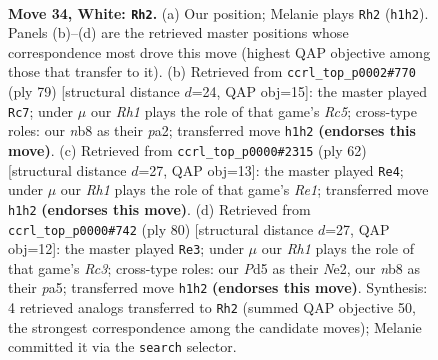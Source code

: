 \documentclass[11pt]{article}
\begin{document}
\clearpage

\begin{figure}[p]\centering
\begin{subfigure}{0.46\textwidth}\centering
\resizebox{\linewidth}{!}{%
\newchessgame
\chessboard[
  setfen={1n4r1/5k2/1p1p4/1P1P4/p1p5/7P/1P1K2P1/7R w - - 2 34},
  showmover=false,
  pgfstyle=straightmove, color=movearrow, markmove={h1-h2}
]}
\caption{}
\end{subfigure}\hfill
\begin{subfigure}{0.46\textwidth}\centering
\resizebox{\linewidth}{!}{%
\newchessgame
\chessboard[
  setfen={8/p3kp1p/6pP/8/2rp2P1/R7/P2K1P2/8 b - - 1 40},
  showmover=false,
  pgfstyle=straightmove, color=movearrow, markmove={c4-c7}
]}
\caption{}
\end{subfigure}
\\[4pt]
\begin{subfigure}{0.46\textwidth}\centering
\resizebox{\linewidth}{!}{%
\newchessgame
\chessboard[
  setfen={5k2/pp6/6p1/2r3Pp/7P/P7/5P2/4R1K1 w - - 0 32},
  showmover=false,
  pgfstyle=straightmove, color=movearrow, markmove={e1-e4}
]}
\caption{}
\end{subfigure}\hfill
\begin{subfigure}{0.46\textwidth}\centering
\resizebox{\linewidth}{!}{%
\newchessgame
\chessboard[
  setfen={8/4k2p/4n1p1/pr2P3/6P1/P1R4P/4N3/3K4 w - - 2 41},
  showmover=false,
  pgfstyle=straightmove, color=movearrow, markmove={c3-e3}
]}
\caption{}
\end{subfigure}
\caption{\textbf{Move 34, White: \texttt{Rh2}.} (a) Our position; Melanie plays \texttt{Rh2} (\texttt{h1h2}). Panels (b)--(d) are the retrieved master positions whose correspondence most drove this move (highest QAP objective among those that transfer to it). (b) Retrieved from \texttt{ccrl\_top\_p0002\#770} (ply 79) [structural distance $d$=24, QAP obj=15]: the master played \texttt{Rc7}; under $\mu$ our \emph{Rh1} plays the role of that game's \emph{Rc5}; cross-type roles: our \emph{n}b8 as their \emph{p}a2; transferred move \texttt{h1h2} \textbf{(endorses this move)}. (c) Retrieved from \texttt{ccrl\_top\_p0000\#2315} (ply 62) [structural distance $d$=27, QAP obj=13]: the master played \texttt{Re4}; under $\mu$ our \emph{Rh1} plays the role of that game's \emph{Re1}; transferred move \texttt{h1h2} \textbf{(endorses this move)}. (d) Retrieved from \texttt{ccrl\_top\_p0000\#742} (ply 80) [structural distance $d$=27, QAP obj=12]: the master played \texttt{Re3}; under $\mu$ our \emph{Rh1} plays the role of that game's \emph{Rc3}; cross-type roles: our \emph{P}d5 as their \emph{N}e2, our \emph{n}b8 as their \emph{p}a5; transferred move \texttt{h1h2} \textbf{(endorses this move)}. Synthesis: 4 retrieved analogs transferred to \texttt{Rh2} (summed QAP objective 50, the strongest correspondence among the candidate moves); Melanie committed it via the \texttt{search} selector.}
\label{fig:thought-m66}
\end{figure}
\end{document}
